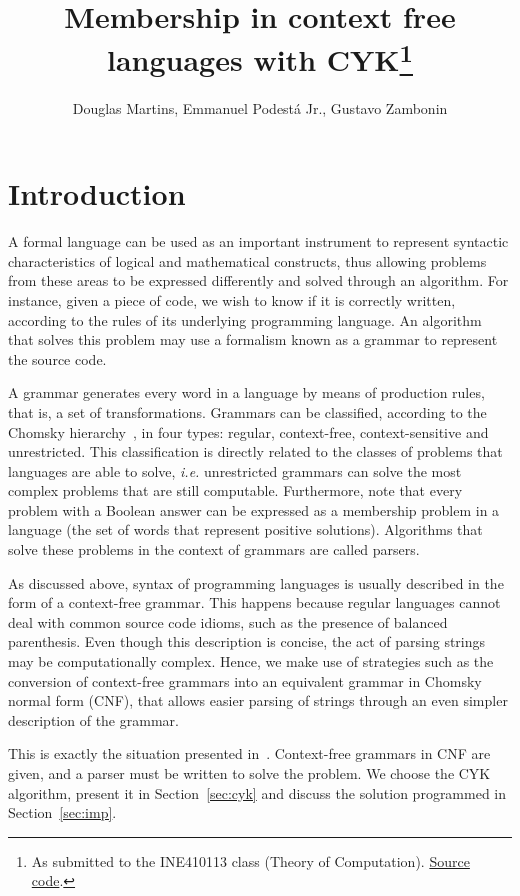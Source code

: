 \documentclass[12pt]{article}
\title{Membership in context free languages with CYK\footnote{
    As submitted to the INE410113 class (Theory of Computation). \href{https://github.com/zambonin/ine410113}{Source code}.}}
\author{Douglas Martins\inst{1}, Emmanuel Podestá Jr.\inst{1}, Gustavo Zambonin\inst{1}}
\begin{document}
 

\maketitle

\section{Introduction}\label{sec:intro}

A formal language can be used as an important instrument to represent syntactic characteristics of logical and mathematical constructs, thus allowing problems from these areas to be expressed differently and solved through an algorithm. For instance, given a piece of code, we wish to know if it is correctly written, according to the rules of its underlying programming language. An algorithm that solves this problem may use a formalism known as a grammar to represent the source code.

A grammar generates every word in a language by means of production rules, that is, a set of transformations. Grammars can be classified, according to the Chomsky hierarchy~\cite{}, in four types: regular, context-free, context-sensitive and unrestricted. This classification is directly related to the classes of problems that languages are able to solve, \emph{i.e.} unrestricted grammars can solve the most complex problems that are still computable. Furthermore, note that every problem with a Boolean answer can be expressed as a membership problem in a language (the set of words that represent positive solutions). Algorithms that solve these problems in the context of grammars are called parsers.

As discussed above, syntax of programming languages is usually described in the form of a context-free grammar. This happens because regular languages cannot deal with common source code idioms, such as the presence of balanced parenthesis. Even though this description is concise, the act of parsing strings may be computationally complex. Hence, we make use of strategies such as the conversion of context-free grammars into an equivalent grammar in Chomsky normal form (CNF), that allows easier parsing of strings through an even simpler description of the grammar.

This is exactly the situation presented in~\cite{}. Context-free grammars in CNF are given, and a parser must be written to solve the problem. We choose the CYK algorithm, present it in Section~\ref{sec:cyk} and discuss the solution programmed in Section~\ref{sec:imp}.
\end{document}
